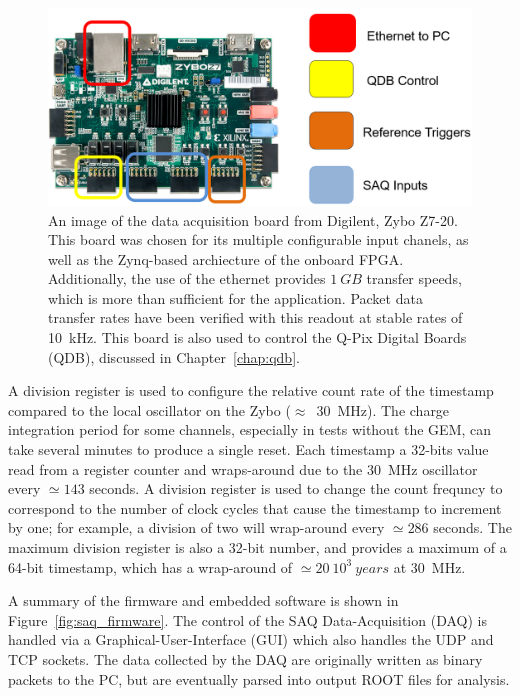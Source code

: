 \begin{figure}[]
\centering
\includegraphics[width=\textwidth]{images/saq_zybo_io_summary.png}
\caption{An image of the data acquisition board from Digilent, Zybo Z7-20. 
This board was chosen for its multiple configurable input chanels, as well as the Zynq-based archiecture of the onboard FPGA.
Additionally, the use of the ethernet provides $1~\unit{GB}$ transfer speeds, which is more than sufficient for the application.
Packet data transfer rates have been verified with this readout at stable rates of 10~\unit{kHz}.
This board is also used to control the Q-Pix Digital Boards (QDB), discussed in Chapter~\ref{chap:qdb}.
}
\label{fig:saq_zybo}
\end{figure}

A division register is used to configure the relative count rate of the timestamp compared to the local oscillator on the Zybo ($\approx$~30~\unit{MHz}).
The charge integration period for some channels, especially in tests without the GEM, can take several minutes to produce a single reset.
Each timestamp a 32-bits value read from a register counter and wraps-around due to the 30~\unit{MHz} oscillator every $\simeq 143$ seconds.
A division register is used to change the count frequncy to correspond to the number of clock cycles that cause the timestamp to increment by one; for example, a division of two will wrap-around every $\simeq 286$ seconds.
The maximum division register is also a 32-bit number, and provides a maximum of a 64-bit timestamp, which has a wrap-around of $\simeq 20~10^3 ~\unit{years}$ at 30~\unit{MHz}.

A summary of the firmware and embedded software is shown in Figure~\ref{fig:saq_firmware}.
The control of the SAQ Data-Acquisition (DAQ) is handled via a Graphical-User-Interface (GUI) which also handles the UDP and TCP sockets.
The data collected by the DAQ are originally written as binary packets to the PC, but are eventually parsed into output ROOT files for analysis.


